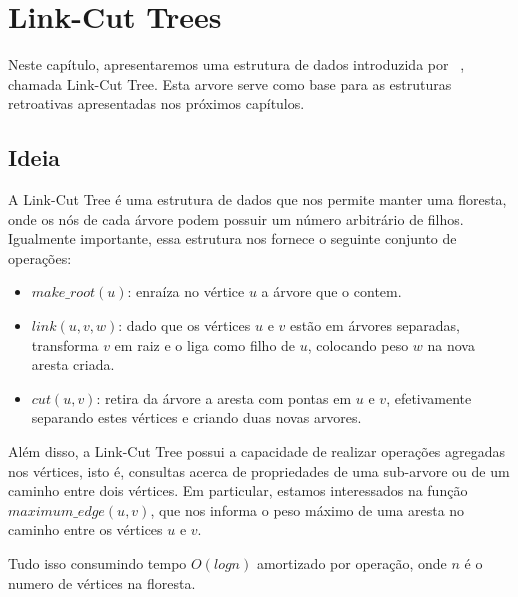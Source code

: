 
\chapter{Link-Cut Trees}
\label{cap:link-cut-trees}

Neste capítulo, apresentaremos uma estrutura de dados introduzida por ~\citet{10.1145/800076.802464}, chamada Link-Cut Tree. Esta arvore serve como base para as estruturas retroativas apresentadas nos próximos capítulos.

\section{Ideia}
\label{sec:lct-ideia}

A Link-Cut Tree é uma estrutura de dados que nos permite manter uma floresta, onde os nós de cada árvore podem possuir um número arbitrário de filhos. Igualmente importante, essa estrutura nos fornece o seguinte conjunto de operações:

\begin{itemize}
    \item $make\_root(u)$: enraíza no vértice $u$ a árvore que o contem.
    \item $link(u, v, w)$: dado que os vértices $u$ e $v$ estão em árvores separadas, transforma $v$ em raiz e o liga como filho de $u$, colocando peso $w$ na nova aresta criada.
    \item $cut(u, v)$: retira da árvore a aresta com pontas em $u$ e $v$, efetivamente separando estes vértices e criando duas novas arvores.
\end{itemize}

Além disso, a Link-Cut Tree possui a capacidade de realizar operações agregadas nos vértices, isto é, consultas acerca de propriedades de uma sub-arvore ou de um caminho entre dois vértices. Em particular, estamos interessados na função $maximum\_edge(u, v)$, que nos informa o peso máximo de uma aresta no caminho entre os vértices $u$ e $v$.

Tudo isso consumindo tempo $O(log n)$ amortizado por operação, onde $n$ é o numero de vértices na floresta.

